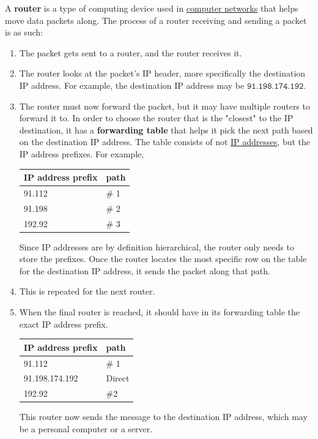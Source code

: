 \documentclass{article}
\newcounter{definition}[section]
\newcounter{example}[section]
\begin{document}
  \begin{definition}[Router]
    \label{def:router}
  A \textbf{router} is a type of computing device used in \hyperref[def:computer-network]{computer networks} that helps move data packets along. The process of a router receiving and sending a packet is as such: 
  \begin{enumerate}
      \item The packet gets sent to a router, and the router receives it. 
      \item The router looks at the packet's IP header, more specifically the destination IP address. For example, the destination IP address may be $\texttt{91.198.174.192}$. 
      \item The router must now forward the packet, but it may have multiple routers to forward it to. In order to choose the router that is the "closest" to the IP destination, it has a \textbf{forwarding table} that helps it pick the next path based on the destination IP address. The table consists of not \hyperref[def:ip-addresses]{IP addresses}, but the IP address prefixes. For example, 
      \begin{center}
      \begin{tabular}{l|l}
          IP address prefix & path\\
          \hline
          91.112 & \# 1\\
          91.198 & \# 2 \\
          192.92 & \# 3
      \end{tabular}
      \end{center}
      Since IP addresses are by definition hierarchical, the router only needs to store the prefixes. Once the router locates the most specific row on the table for the destination IP address, it sends the packet along that path. 
      \item This is repeated for the next router. 
      \item When the final router is reached, it should have in its forwarding table the exact IP address prefix. 
      \begin{center}
      \begin{tabular}{l|l}
          IP address prefix & path \\
          \hline
          91.112 & \# 1 \\
          91.198.174.192 & Direct \\
          192.92 & \#2 
      \end{tabular}
      \end{center}
      This router now sends the message to the destination IP address, which may be a personal computer or a server. 
  \end{enumerate}
  \end{definition}
\end{document}
